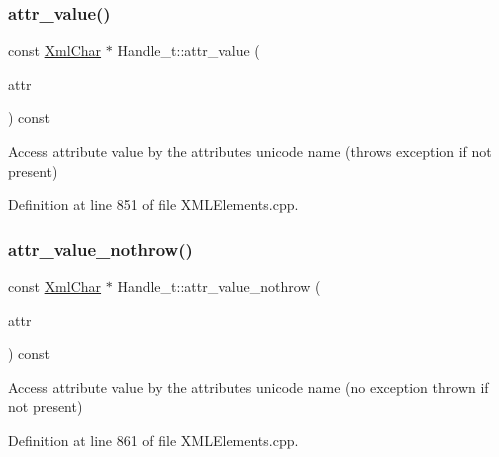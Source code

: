 \subsubsection{\texorpdfstring{attr\+\_\+value()}{attr\_value()}\hspace{0.1cm}{\footnotesize\ttfamily [2/2]}}
{\footnotesize\ttfamily const \hyperlink{namespace_d_d4hep_1_1_x_m_l_a09e5d9cc86ed782f6826dfe0778c1815}{Xml\+Char} $\ast$ Handle\+\_\+t\+::attr\+\_\+value (\begin{DoxyParamCaption}\item[{const \hyperlink{namespace_d_d4hep_1_1_x_m_l_a09e5d9cc86ed782f6826dfe0778c1815}{Xml\+Char} $\ast$}]{attr }\end{DoxyParamCaption}) const}



Access attribute value by the attribute\textquotesingle{}s unicode name (throws exception if not present) 



Definition at line 851 of file X\+M\+L\+Elements.\+cpp.

\hypertarget{class_d_d4hep_1_1_x_m_l_1_1_handle__t_a690047ce386db6a1a783dcb419ec39c1}{}\label{class_d_d4hep_1_1_x_m_l_1_1_handle__t_a690047ce386db6a1a783dcb419ec39c1} 
\subsubsection{\texorpdfstring{attr\+\_\+value\+\_\+nothrow()}{attr\_value\_nothrow()}}
{\footnotesize\ttfamily const \hyperlink{namespace_d_d4hep_1_1_x_m_l_a09e5d9cc86ed782f6826dfe0778c1815}{Xml\+Char} $\ast$ Handle\+\_\+t\+::attr\+\_\+value\+\_\+nothrow (\begin{DoxyParamCaption}\item[{const \hyperlink{namespace_d_d4hep_1_1_x_m_l_a09e5d9cc86ed782f6826dfe0778c1815}{Xml\+Char} $\ast$}]{attr }\end{DoxyParamCaption}) const}



Access attribute value by the attribute\textquotesingle{}s unicode name (no exception thrown if not present) 



Definition at line 861 of file X\+M\+L\+Elements.\+cpp.

